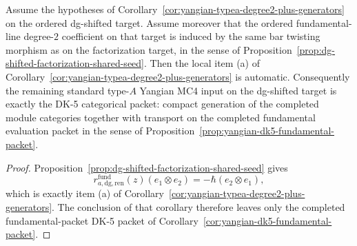 \begin{corollary}
\label{cor:yangian-typea-dg-local-closure}
Assume the hypotheses of
Corollary~\ref{cor:yangian-typea-degree2-plus-generators} on the
ordered dg-shifted target.  Assume moreover that the ordered
fundamental-line degree-$2$ coefficient on that target is induced by
the same bar twisting morphism as on the factorization target, in the
sense of Proposition~\ref{prop:dg-shifted-factorization-shared-seed}.
Then the local item \textup{(a)} of
Corollary~\ref{cor:yangian-typea-degree2-plus-generators} is
automatic.  Consequently the remaining standard type-$A$ Yangian MC4
input on the dg-shifted target is exactly the DK-5 categorical packet:
compact generation of the completed module categories together with
transport on the completed fundamental evaluation packet in the sense
of Proposition~\ref{prop:yangian-dk5-fundamental-packet}.
\end{corollary}

\begin{proof}
Proposition~\ref{prop:dg-shifted-factorization-shared-seed} gives
\[
r_{a,\mathrm{dg,ren}}^{\mathrm{fund}}(z)(e_1\otimes e_2)
=
-\hbar(e_2\otimes e_1),
\]
which is exactly item \textup{(a)} of
Corollary~\ref{cor:yangian-typea-degree2-plus-generators}.  The
conclusion of that corollary therefore leaves only the
completed fundamental-packet DK-5 packet of
Corollary~\ref{cor:yangian-dk5-fundamental-packet}.
\end{proof}


